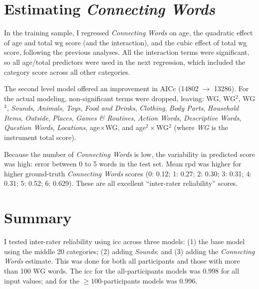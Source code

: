 \documentclass[letterpaper]{article}
\newcommand{\cwords}{\textit{Connecting Words}}
\newcommand{\food}{\textit{Food and Drinks}}
\begin{document}
    \section{Estimating \cwords{}}

    In the training sample, I regressed \cwords{} on age, the quadratic effect
    of age and total \gls{wg} score (and the interaction), and the cubic
    effect of total \gls{wg} score, following the previous analyses. All the
    interaction terms were significant, so all age/total predictors were used
    in the next regression, which included the category score across all other
    categories.

    The second level model offered an improvement in AICc (14802 $\rightarrow$
    13286). For the actual modeling,
    non-significant terms were dropped, leaving:
    WG, WG$^2$, WG$^3$, \textit{Sounds}, \textit{Animals}, \textit{Toys},
    \food, \textit{Clothing}, \textit{Body Parts},
    \textit{Household Items}, \textit{Outside}, \textit{Places},
     \textit{Games \& Routines}, \textit{Action Words},
    \textit{Descriptive Words}, \textit{Question Words}, \textit{Locations},
    age$\times$WG, and
    age$^2\times$WG$^2$
    (where \textit{WG} is the instrument total score).

    Because the number of \cwords{} is low, the variability in predicted score
    was high: error between 0 to 5 words in the test set. Mean \gls{rpd} was
    higher for higher ground-truth \cwords{} scores
    (0: 0.12; 1: 0.27; 2: 0.30; 3: 0.31; 4: 0.31; 5: 0.52; 6: 0.629).
    These are all excellent ``inter-rater reliability'' scores.

    \section{Summary}

    I tested inter-rater reliability using \gls{icc} across three models:
    (1) the base model using the middle 20 categories; (2) adding
    \textit{Sounds}; and (3) adding the \cwords{} estimate. This was done for
    both all participants and those with more than 100 WG words. The \gls{icc}
    for the all-participants models was 0.998 for all input values; and for
    the $\ge100$-participants models was 0.996.
\end{document}
